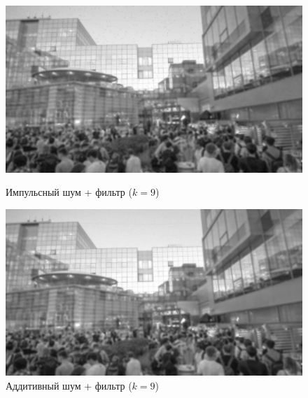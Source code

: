 \documentclass[a4paper]{article}
\begin{document}
\begin{figure}[H]
    \begin{minipage}{0.49\textwidth}
        \centering \includegraphics[width=\textwidth]{images/3_nonlinear_filters/impulse - wiener (k=9).jpg}
        \caption{Импульсный шум + фильтр ($k = 9$)}
    \end{minipage}\hfill
    \begin{minipage}{0.49\textwidth}
        \centering \includegraphics[width=\textwidth]{images/3_nonlinear_filters/additive - wiener (k=9).jpg}
        \caption{Аддитивный шум + фильтр ($k = 9$)}
    \end{minipage}
\end{figure}
\end{document}
